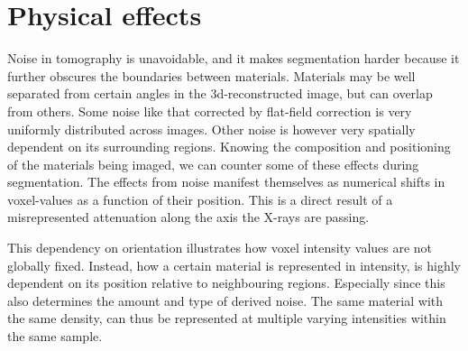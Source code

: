 \section{Physical effects}
\label{sec:physics}

Noise in tomography is unavoidable, and it makes segmentation harder because it further obscures the
boundaries between materials. Materials may be well separated from certain angles in the
3d-reconstructed image, but can overlap from others. Some noise like that corrected by flat-field
correction is very uniformly distributed across images. Other noise is however very spatially
dependent on its surrounding regions. Knowing the composition and positioning of the materials being
imaged, we can counter some of these effects during segmentation. The effects from noise manifest
themselves as numerical shifts in voxel-values as a function of their position. This is a direct
result of a misrepresented attenuation along the axis the X-rays are passing.

This dependency on orientation illustrates how voxel intensity values are not globally fixed.
Instead, how a certain material is represented in intensity, is highly dependent on its position
relative to neighbouring regions. Especially since this also determines the amount and type of
derived noise.  The same material with the same density, can thus be represented at multiple varying
intensities within the same sample.


